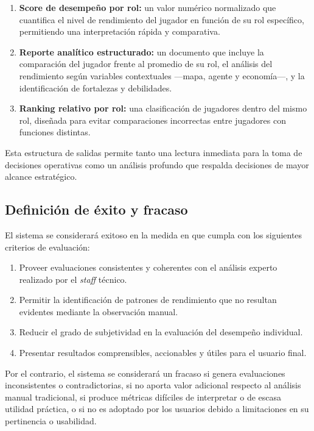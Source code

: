 \documentclass{ULBreport} %
\begin{document}
\begin{enumerate}
    \item \textbf{Score de desempeño por rol:} un valor numérico normalizado que cuantifica el nivel de rendimiento del jugador en función de su rol específico, permitiendo una interpretación rápida y comparativa.
    \item \textbf{Reporte analítico estructurado:} un documento que incluye la comparación del jugador frente al promedio de su rol, el análisis del rendimiento según variables contextuales ---mapa, agente y economía---, y la identificación de fortalezas y debilidades.
    \item \textbf{Ranking relativo por rol:} una clasificación de jugadores dentro del mismo rol, diseñada para evitar comparaciones incorrectas entre jugadores con funciones distintas.
\end{enumerate}

Esta estructura de salidas permite tanto una lectura inmediata para la toma de decisiones operativas como un análisis profundo que respalda decisiones de mayor alcance estratégico.

\subsection{Definición de éxito y fracaso}

El sistema se considerará exitoso en la medida en que cumpla con los siguientes criterios de evaluación:

\begin{enumerate}
    \item Proveer evaluaciones consistentes y coherentes con el análisis experto realizado por el \textit{staff} técnico.
    \item Permitir la identificación de patrones de rendimiento que no resultan evidentes mediante la observación manual.
    \item Reducir el grado de subjetividad en la evaluación del desempeño individual.
    \item Presentar resultados comprensibles, accionables y útiles para el usuario final.
\end{enumerate}

Por el contrario, el sistema se considerará un fracaso si genera evaluaciones inconsistentes o contradictorias, si no aporta valor adicional respecto al análisis manual tradicional, si produce métricas difíciles de interpretar o de escasa utilidad práctica, o si no es adoptado por los usuarios debido a limitaciones en su pertinencia o usabilidad.
\end{document}
